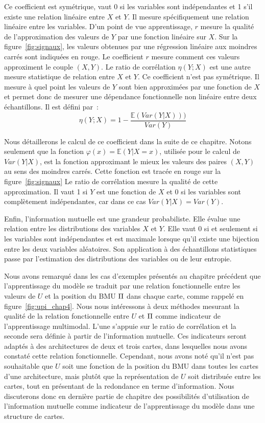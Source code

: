 \documentclass[../main]{subfiles}
\begin{document}
Ce coefficient est symétrique, vaut 0 si les variables sont indépendantes et 1 s'il existe une relation linéaire entre $X$ et $Y$. Il mesure spécifiquement une relation linéaire entre les variables. 
D'un point de vue apprentissage, $r$ mesure la qualité de l'approximation des valeurs de $Y$ par une fonction linéaire sur $X$. 
Sur la figure~\ref{fig:signaux}, les valeurs obtenues par une régression linéaire aux moindres carrés sont indiquées en rouge. Le coefficient $r$ mesure comment ces valeurs approximent le couple $(X,Y)$. 
Le ratio de corrélation $\eta(Y;X)$ est une autre mesure statistique de relation entre $X$ et $Y$. Ce coefficient n'est pas symétrique. 
Il mesure à quel point les valeurs de $Y$ sont bien approximées par une fonction de $X$ et permet donc de mesurer une dépendance fonctionnelle non linéaire entre deux échantillons.
Il est défini par~:
\begin{equation}
    \eta(Y;X) = 1 - \frac{\mathbb{E}(Var(Y|X)))}{Var(Y)}
\end{equation}

Nous détaillerons le calcul de ce coefficient dans la suite de ce chapitre. Notons seulement que la fonction $\varphi(x) = \mathbb{E}(Y|X = x)$, utilisée pour le calcul de $Var(Y|X)$, est la fonction approximant le mieux les valeurs des paires $(X,Y)$ au sens des moindres carrés. Cette fonction est tracée en rouge sur la figure~\ref{fig:signaux}
Le ratio de corrélation mesure la qualité de cette approximation. Il vaut 1 si $Y$ est une fonction de $X$ et 0 si les variables sont complètement indépendantes, car dans ce cas $Var(Y|X) = Var(Y)$.

Enfin, l'information mutuelle est une grandeur probabiliste.
Elle évalue une relation entre les distributions des variables $X$ et $Y$. Elle vaut 0 si et seulement si les variables sont indépendantes et est maximale lorsque qu'il existe une bijection entre les deux variables aléatoires.
Son application à des échantillons statistiques passe par l'estimation des distributions des variables ou de leur entropie.

Nous avons remarqué dans les cas d'exemples présentés au chapitre précédent que l'apprentissage du modèle se traduit par une relation fonctionnelle entre les valeurs de $U$ et la position du BMU $\Pi$ dans chaque carte, comme rappelé en figure~\ref{fig:upi_chap4}.
Nous nous intéressons à deux méthodes mesurant la qualité de la relation fonctionnelle entre $U$ et $\Pi$ comme indicateur de l'apprentissage multimodal. L'une s'appuie sur le ratio de corrélation et la seconde sera définie à partir de l'information mutuelle.
Ces indicateurs seront adaptés à des architectures de deux et trois cartes, dans lesquelles nous avons constaté cette relation fonctionnelle. 
Cependant, nous avons noté qu'il n'est pas souhaitable que $U$ soit une fonction de la position du BMU dans toutes les cartes d'une architecture, mais plutôt que la représentation de $U$ soit distribuée entre les cartes, tout en présentant de la redondance en terme d'information.
Nous discuterons donc en dernière partie de chapitre des possibilités d'utilisation de l'information mutuelle comme indicateur de l'apprentissage du modèle dans une structure de cartes.
\end{document}
